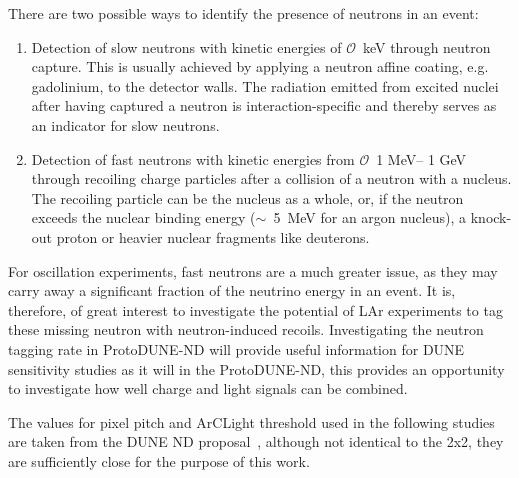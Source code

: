 There are two possible ways to identify the presence of neutrons in an event:
\begin{enumerate}
\item Detection of slow neutrons with kinetic energies of $\mathcal{O}$~keV through neutron capture. This is usually achieved by applying a neutron affine coating, e.g. gadolinium, to the detector walls. The radiation emitted from excited nuclei after having captured a neutron is interaction-specific and thereby serves as an indicator for slow neutrons.
\item Detection of fast neutrons with kinetic energies from $\mathcal{O}$~1 MeV-- 1 GeV through recoiling charge particles after a collision of a neutron with a nucleus. The recoiling particle can be the nucleus as a whole, or, if the neutron exceeds the nuclear binding energy ($\sim$~5~MeV for an argon nucleus), a knock-out proton or heavier nuclear fragments like deuterons.
\end{enumerate}
For oscillation experiments, fast neutrons are a much greater issue, as they may carry away a significant fraction of the neutrino energy in an event. It is, therefore, of great interest to investigate the potential of LAr experiments to tag these missing neutron with neutron-induced recoils. Investigating the neutron tagging rate in ProtoDUNE-ND will provide useful information for DUNE sensitivity studies as it will in the ProtoDUNE-ND, this provides an opportunity to investigate how well charge and light signals can be combined.

The values for pixel pitch and ArCLight threshold used in the following studies are taken from the DUNE ND proposal~\cite{argoncube_loi}, although not identical to the 2x2, they are sufficiently close for the purpose of this work.  

